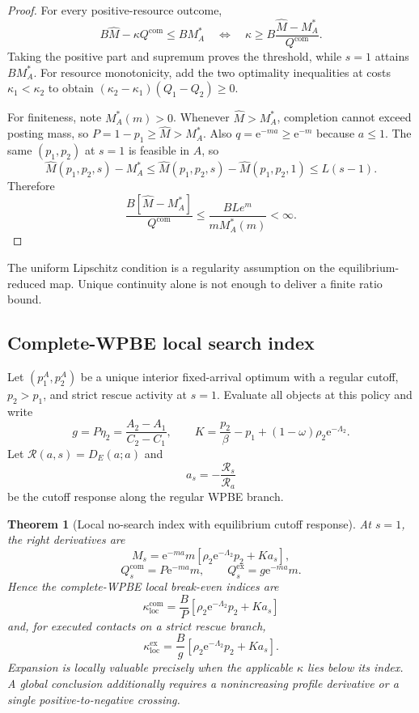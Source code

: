 \documentclass[11pt]{article}
\newtheorem{theorem}{Theorem}
\theoremstyle{definition}
\theoremstyle{remark}
\newcommand{\e}{\mathrm e}
\newcommand{\com}{\mathrm{com}}
\newcommand{\ex}{\mathrm{ex}}
\begin{document}
\begin{proof}
For every positive-resource outcome,
\[
B\widehat M-\kappa Q^{\com}\le BM_A^*
\quad\Longleftrightarrow\quad
\kappa\ge B\frac{\widehat M-M_A^*}{Q^{\com}}.
\]
Taking the positive part and supremum proves the threshold, while $s=1$
attains $BM_A^*$.  For resource monotonicity, add the two optimality
inequalities at costs $\kappa_1<\kappa_2$ to obtain
$(\kappa_2-\kappa_1)(Q_1-Q_2)\ge0$.

For finiteness, note $M_A^*(m)>0$.  Whenever $\widehat M>M_A^*$,
completion cannot exceed posting mass, so
$P=1-p_1\ge\widehat M>M_A^*$.  Also $q=\e^{-ma}\ge\e^{-m}$ because
$a\le1$.  The same $(p_1,p_2)$ at $s=1$ is feasible in $A$, so
\[
\widehat M(p_1,p_2,s)-M_A^*
\le\widehat M(p_1,p_2,s)-\widehat M(p_1,p_2,1)
\le L(s-1).
\]
Therefore
\[
\frac{B[\widehat M-M_A^*]}{Q^{\com}}
\le\frac{BLe^m}{mM_A^*(m)}<\infty.
\]
\end{proof}

The uniform Lipschitz condition is a regularity assumption on the
equilibrium-reduced map.  Unique continuity alone is not enough to deliver a
finite ratio bound.

\subsection{Complete-WPBE local search index}

Let $(p_1^A,p_2^A)$ be a unique interior fixed-arrival optimum with a regular
cutoff, $p_2>p_1$, and strict rescue activity at $s=1$.  Evaluate all objects
at this policy and write
\[
g=P\eta_2=\frac{A_2-A_1}{C_2-C_1},
\qquad
K=\frac{p_2}{\beta}-p_1+(1-\omega)\rho_2\e^{-\Lambda_2}.
\]
Let $\mathcal R(a,s)=D_E(a;a)$ and
\[
a_s=-\frac{\mathcal R_s}{\mathcal R_a}
\]
be the cutoff response along the regular WPBE branch.

\begin{theorem}[Local no-search index with equilibrium cutoff response]
\label{thm:local}
At $s=1$, the right derivatives are
\[
M_s=\e^{-ma}m
\left[\rho_2\e^{-\Lambda_2}p_2+K a_s\right],
\]
\[
Q_s^{\com}=P\e^{-ma}m,
\qquad
Q_s^{\ex}=g\e^{-ma}m.
\]
Hence the complete-WPBE local break-even indices are
\[
\boxed{
\kappa_{\mathrm{loc}}^{\com}
=\frac{B}{P}
\left[\rho_2\e^{-\Lambda_2}p_2+K a_s\right] }
\]
and, for executed contacts on a strict rescue branch,
\[
\boxed{
\kappa_{\mathrm{loc}}^{\ex}
=\frac{B}{g}
\left[\rho_2\e^{-\Lambda_2}p_2+K a_s\right] . }
\]
Expansion is locally valuable precisely when the applicable $\kappa$ lies
below its index.  A global conclusion additionally requires a nonincreasing
profile derivative or a single positive-to-negative crossing.
\end{theorem}
\end{document}
